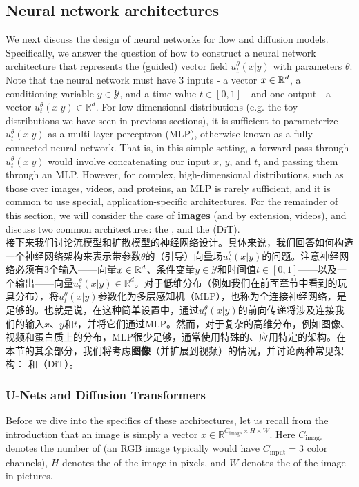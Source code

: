 \subsection{Neural network architectures}

\label{sec:image_architecture}
We next discuss the design of neural networks for flow and diffusion models. Specifically, we answer the question of how to construct a neural network architecture that represents the (guided) vector field $u_t^\theta(x|y)$ with parameters $\theta$. Note that the neural network must have 3 inputs - a vector $x\in\mathbb{R}^d$, a conditioning variable $y\in\mathcal{Y}$, and a time value $t\in [0,1]$ - and one output - a vector $u_t^\theta(x|y)\in\mathbb{R}^d$. For low-dimensional distributions (e.g. the toy distributions we have seen in previous sections), it is sufficient to parameterize $u_t^\theta(x|y)$ as a multi-layer perceptron (MLP), otherwise known as a fully connected neural network. That is, in this simple setting, a forward pass through $u_t^\theta(x|y)$ would involve concatenating our input $x$, $y$, and $t$, and passing them through an MLP. However, for complex, high-dimensional distributions, such as those over images, videos, and proteins, an MLP is rarely sufficient, and it is common to use special, application-specific architectures. For the remainder of this section, we will consider the case of \textbf{images} (and by extension, videos), and discuss two common architectures: the  \citep{ronneberger2015u}, and the  (DiT).\\

\label{sec:image_architecture}
接下来我们讨论流模型和扩散模型的神经网络设计。具体来说，我们回答如何构造一个神经网络架构来表示带参数$\theta$的（引导）向量场$u_t^\theta(x|y)$的问题。注意神经网络必须有3个输入——向量$x\in\mathbb{R}^d$、条件变量$y\in\mathcal{Y}$和时间值$t\in [0,1]$——以及一个输出——向量$u_t^\theta(x|y)\in\mathbb{R}^d$。对于低维分布（例如我们在前面章节中看到的玩具分布），将$u_t^\theta(x|y)$参数化为多层感知机（MLP），也称为全连接神经网络，是足够的。也就是说，在这种简单设置中，通过$u_t^\theta(x|y)$的前向传递将涉及连接我们的输入$x$、$y$和$t$，并将它们通过MLP。然而，对于复杂的高维分布，例如图像、视频和蛋白质上的分布，MLP很少足够，通常使用特殊的、应用特定的架构。在本节的其余部分，我们将考虑\textbf{图像}（并扩展到视频）的情况，并讨论两种常见架构： \citep{ronneberger2015u}和（DiT）。\\

\subsubsection{U-Nets and Diffusion Transformers}
Before we dive into the specifics of these architectures, let us recall from the introduction that an image is simply a vector $x \in \mathbb{R}^{C_{\text{image}} \times H \times W}$. Here $C_{\text{image}}$ denotes the number of  (an RGB image typically would have $C_{\text{input}} = 3$ color channels), $H$ denotes the  of the image in pixels, and $W$ denotes the  of the image in pictures. %

